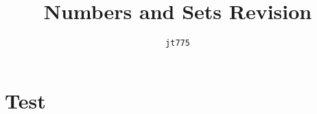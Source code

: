 \documentclass{article}
\title{\textbf{Numbers and Sets Revision}}
\author{\texttt{jt775}}
\date{\null}
\begin{document}
\maketitle    

\section{Test}
\end{document}
